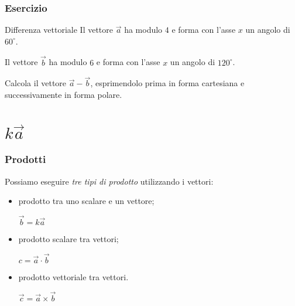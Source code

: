 \documentclass[]{beamer}
\theoremstyle{plain}
\begin{document}
\begin{frame}
  \frametitle{Esercizio}
  \begin{exampleblock}{Differenza vettoriale}
  Il vettore $ \vec{a} $ ha modulo $ 4 $ e forma con l'asse $ x $ un angolo di $ 60^\circ $.
  
  Il vettore $ \vec{b} $ ha modulo $ 6 $ e forma con l'asse $ x $ un angolo di $ 120^\circ $.
  
  Calcola il vettore $ \vec{a} - \vec{b} $, esprimendolo prima in forma cartesiana e successivamente in forma polare.
  \end{exampleblock} 
  \end{frame}


\section{$ k\vec{a} $}

\begin{frame}
  \frametitle{Prodotti}
  Possiamo eseguire \emph{tre tipi di prodotto} utilizzando i vettori:
  \begin{itemize}
    \item prodotto tra uno scalare e un vettore;
    \begin{center}
\colorbox{blue!30}{ $ \vec{b} = k\vec{a} $ }
\end{center}\pause
    \item prodotto scalare tra vettori;
    \begin{center}
\colorbox{blue!30}{ $ c = \vec{a} \cdot \vec{b} $ }
\end{center}\pause
    \item prodotto vettoriale tra vettori.
    \begin{center}
\colorbox{blue!30}{ $ \vec{c} = \vec{a} \times\vec{b} $ }
\end{center}
  \end{itemize}
\end{frame}
\end{document}
